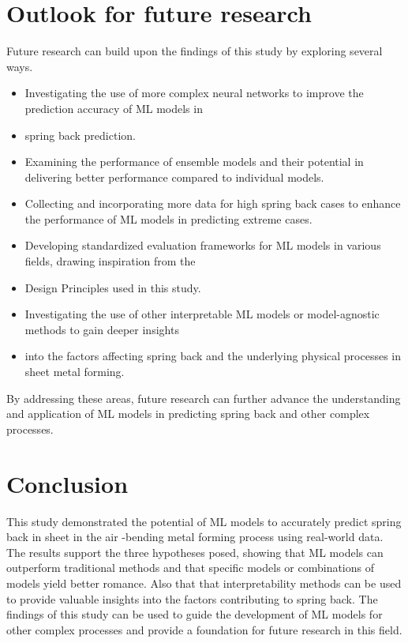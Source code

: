 \section{Outlook for future research}\label{subsec:outlook-for-future-research}


Future research can build upon the findings of this study by exploring several ways.

\begin{itemize}
    \item Investigating the use of more complex neural networks to improve the prediction accuracy of ML models in
    \item spring back
    prediction.
    \item Examining the performance of ensemble models and their potential in delivering better performance compared to
    individual models.
    \item Collecting and incorporating more data for high spring back cases to enhance the performance of ML models in
    predicting extreme cases.
    \item Developing standardized evaluation frameworks for ML models in various fields, drawing inspiration from the
    \item Design
    Principles used in this study.
    \item Investigating the use of other interpretable ML models or model-agnostic methods to gain deeper insights
    \item into the
    factors affecting spring back and the underlying physical processes in sheet metal forming.
\end{itemize}

By addressing these areas, future research can further advance the understanding and application of ML models in
predicting spring back and other complex processes.


\section{Conclusion}\label{sec:conclusion}
This study demonstrated the potential of \ac{ML} models to accurately predict spring back in sheet in the air
-bending metal forming process using real-world data.
The results support the three hypotheses posed, showing that \ac{ML} models can outperform traditional methods and
that specific models or combinations of models yield better romance.
Also that that interpretability methods can be used to provide valuable insights into the factors contributing to
spring back.
The findings of this study can be used to guide the development of \ac{ML} models for other complex processes and
provide a foundation for future research in this field.
